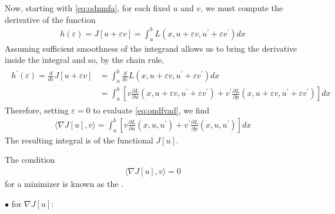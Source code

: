 \documentclass{article}
\begin{document}
Now, starting with \cref{eq:odnmfa}, for each fixed $u$ and $v$, we must compute the derivative of the function
\begin{align*}
h(\varepsilon)=J[u+\varepsilon v]=\int_{a}^{b} L\left(x, u+\varepsilon v, u^{\prime}+\varepsilon v^{\prime}\right) d x
\end{align*}
Assuming sufficient smoothness of the integrand allows us to bring the derivative inside the integral and so, by the chain rule,
\begin{align*}
\begin{aligned}
h^{\prime}(\varepsilon)=\frac{d}{d \varepsilon} J[u+\varepsilon v] &=\int_{a}^{b} \frac{d}{d \varepsilon} L\left(x, u+\varepsilon v, u^{\prime}+\varepsilon v^{\prime}\right) d x \\
&=\int_{a}^{b}\left[v \frac{\partial L}{\partial u}\left(x, u+\varepsilon v, u^{\prime}+\varepsilon v^{\prime}\right)+v^{\prime} \frac{\partial L}{\partial p}\left(x, u+\varepsilon v, u^{\prime}+\varepsilon v^{\prime}\right)\right] d x
\end{aligned}
\end{align*}
Therefore, setting $\varepsilon=0$  to evaluate \cref{eq:ondfvad}, we find
\begin{align}
\langle\nabla J[u], v\rangle=\int_{a}^{b}\left[v \frac{\partial L}{\partial u}\left(x, u, u^{\prime}\right)+v^{\prime} \frac{\partial L}{\partial p}\left(x, u, u^{\prime}\right)\right] d x \label{eq:opdncdf}
\end{align}
The resulting integral is  of the functional $J[u]$. 

The condition
\begin{align*}
\langle\nabla J[u], v\rangle=0
\end{align*}
for a minimizer is known as the .


$\bullet$  for $\nabla J[u]$:
\end{document}
